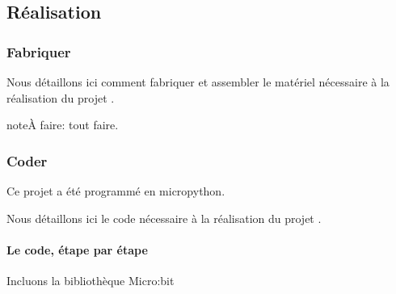 \documentclass[letterpaper,10pt,french]{sphinxmanual}
\begin{document}
\subsection{Réalisation}
\label{\detokenize{projets/temperature:realisation}}

\subsubsection{Fabriquer}
\label{\detokenize{projets/temperature-fabriquer:projettempfabriquer}}\label{\detokenize{projets/temperature-fabriquer::doc}}\label{\detokenize{projets/temperature-fabriquer:fabriquer}}
Nous détaillons ici comment fabriquer et assembler
le matériel nécessaire à la réalisation du projet
{\hyperref[\detokenize{projets/temperature:projettemp}]{}}.

\begin{sphinxadmonition}{note}{\label{projets/temperature-fabriquer:index-0}À faire:}
tout faire.
\end{sphinxadmonition}


\subsubsection{Coder}
\label{\detokenize{projets/temperature-coder:projettempcoder}}\label{\detokenize{projets/temperature-coder:coder}}\label{\detokenize{projets/temperature-coder::doc}}
Ce projet a été programmé en micropython.

Nous détaillons ici le code nécessaire à la réalisation
du projet {\hyperref[\detokenize{projets/temperature:projettemp}]{}}.

\ignorespaces 

\paragraph{Le code, étape par étape}
\label{\detokenize{projets/temperature-coder:le-code-etape-par-etape}}\label{\detokenize{projets/temperature-coder:index-0}}
Incluons la bibliothèque Micro:bit

%
\begin{sphinxVerbatim}[commandchars=\\\{\}]
   
\end{sphinxVerbatim}
\end{document}
